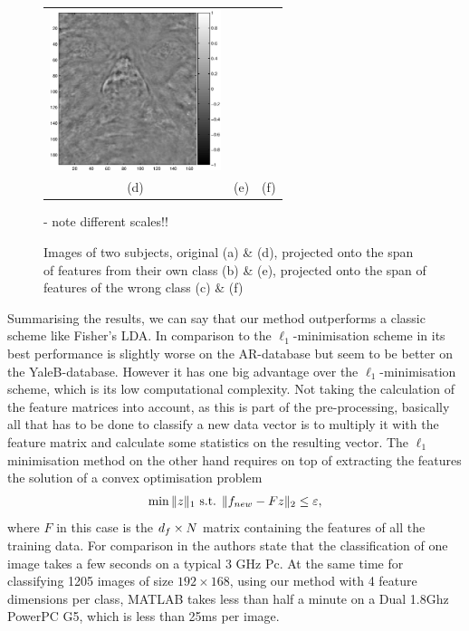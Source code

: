 \documentclass[11pt]{article}
\begin{document}
\begin{figure}[htb]
\begin{tabular}{ccc}
   \includegraphics[width=5cm]{sub21.eps}\\
  (d)&(e)&(f)
  \end{tabular}
    \caption{Images of two subjects, original (a) \& (d), projected onto the span of features from their own class (b) \& (e), projected onto the span of features of the wrong class (c) \& (f) \label{fig:faces}} - note different scales!!
\end{figure}


Summarising the results, we can say that our method outperforms a classic scheme like Fisher's LDA. In comparison to the $\ell_1$-minimisation scheme in \cite{wrma09} its best performance is slightly worse on the AR-database but seem to be better on the YaleB-database. However it has one big advantage over the $\ell_1$-minimisation scheme, which is its low computational complexity. Not taking the calculation of the feature matrices into account, as this is part of the pre-processing, basically all that has to be done to classify a new data vector is to multiply it with the feature matrix and calculate some statistics on the resulting vector. The $\ell_1$ minimisation method on the other hand requires on top of extracting the features the solution of a convex optimisation problem
\begin{align}
\min \|z\|_1  \mbox{ s.t. } \| f_{new} - F z\|_2\leq {\varepsilon},
\end{align}
where $F$ in this case is the $d_f \times {N}$ matrix containing the features of all the training data.
For comparison in \cite{wrma09} the authors state that the classification of one image takes a few seconds on a typical 3 GHz Pc.  At the same time for classifying 1205 images of size $192\times 168$, using our method with 4 feature dimensions per class, MATLAB takes less than half a minute on a Dual 1.8Ghz PowerPC G5, which is less than 25ms per image.


\end{document}
